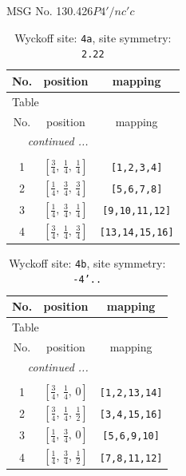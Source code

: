 \documentclass[fleqn,8pt]{jsarticle}
\begin{document}
\setcounter{MaxMatrixCols}{32}

\renewcommand{\tablename}{Table~}
\renewcommand{\figurename}{Figure~}
\begin{center}
\LARGE
MSG No. 130.426\quad$P4'/nc'c$
\end{center}
\renewcommand{\arraystretch}{1.2}
\begin{longtable}{ccc}
\caption{Wyckoff site: {\tt 4a}, site symmetry: {\tt 2.22}}
 \\
 \hline \hline
No. & position & mapping \\ \hline \endfirsthead

\multicolumn{2}{l}{\tablename\ \thetable{}} \\
 \hline \hline
No. & position & mapping \\ \hline \endhead

 \hline \hline
\multicolumn{2}{r}{\footnotesize\it continued ...} \\ \endfoot

 \hline \hline
\multicolumn{2}{r}{} \\ \endlastfoot

1 & $\left[ \frac{3}{4},\, \frac{1}{4},\, \frac{1}{4} \right]$ & {\tt [1,2,3,4]} \\ \hline
2 & $\left[ \frac{1}{4},\, \frac{3}{4},\, \frac{3}{4} \right]$ & {\tt [5,6,7,8]} \\ \hline
3 & $\left[ \frac{1}{4},\, \frac{3}{4},\, \frac{1}{4} \right]$ & {\tt [9,10,11,12]} \\ \hline
4 & $\left[ \frac{3}{4},\, \frac{1}{4},\, \frac{3}{4} \right]$ & {\tt [13,14,15,16]} \\
\end{longtable}
\renewcommand{\arraystretch}{1.2}
\begin{longtable}{ccc}
\caption{Wyckoff site: {\tt 4b}, site symmetry: {\tt -4'..}}
 \\
 \hline \hline
No. & position & mapping \\ \hline \endfirsthead

\multicolumn{2}{l}{\tablename\ \thetable{}} \\
 \hline \hline
No. & position & mapping \\ \hline \endhead

 \hline \hline
\multicolumn{2}{r}{\footnotesize\it continued ...} \\ \endfoot

 \hline \hline
\multicolumn{2}{r}{} \\ \endlastfoot

1 & $\left[ \frac{3}{4},\, \frac{1}{4},\, 0 \right]$ & {\tt [1,2,13,14]} \\ \hline
2 & $\left[ \frac{3}{4},\, \frac{1}{4},\, \frac{1}{2} \right]$ & {\tt [3,4,15,16]} \\ \hline
3 & $\left[ \frac{1}{4},\, \frac{3}{4},\, 0 \right]$ & {\tt [5,6,9,10]} \\ \hline
4 & $\left[ \frac{1}{4},\, \frac{3}{4},\, \frac{1}{2} \right]$ & {\tt [7,8,11,12]} \\
\end{longtable}
\end{document}
